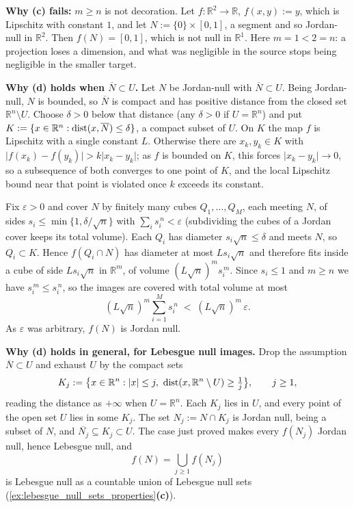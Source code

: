 \begin{exercisesolution}
\textbf{Why (c) fails:} $m \geq n$ is not decoration. Let $f : \mathbb{R}^2 \to \mathbb{R}$,
$f(x,y) := y$, which is Lipschitz with constant $1$, and let
$N := \{0\}\times[0,1]$, a segment and so Jordan-null in $\mathbb{R}^2$. Then $f(N) = [0,1]$,
which is not null in $\mathbb{R}^1$. Here $m = 1 < 2 = n$: a projection loses a dimension, and
what was negligible in the source stops being negligible in the smaller target.

\textbf{Why (d) holds when $\overline N \subset U$.} Let $N$ be Jordan-null with
$\overline N \subset U$. Being Jordan-null, $N$ is bounded, so $\overline N$ is compact and has
positive distance from the closed set $\mathbb{R}^n \setminus U$. Choose $\delta > 0$ below that
distance (any $\delta > 0$ if $U = \mathbb{R}^n$) and put
$K := \{x \in \mathbb{R}^n : \operatorname{dist}(x,\overline N) \leq \delta\}$, a compact subset of $U$. On $K$
the map $f$ is Lipschitz with a single constant $L$. Otherwise there are $x_k, y_k \in K$ with
$\lvert f(x_k) - f(y_k)\rvert > k\lvert x_k - y_k\rvert$; as $f$ is bounded on $K$, this forces
$\lvert x_k - y_k\rvert \to 0$, so a subsequence of both converges to one point of $K$, and the
local Lipschitz bound near that point is violated once $k$ exceeds its constant.

Fix $\varepsilon > 0$ and cover $N$ by finitely many cubes $Q_1,\dots,Q_M$, each meeting $N$, of
sides $s_i \leq \min\{1,\delta/\sqrt n\}$ with $\sum_i s_i^{\,n} < \varepsilon$ (subdividing the
cubes of a Jordan cover keeps its total volume). Each $Q_i$ has diameter
$s_i\sqrt n \leq \delta$ and meets $N$, so $Q_i \subset K$. Hence $f(Q_i \cap N)$ has diameter at
most $L s_i\sqrt n$ and therefore fits inside a cube of side $L s_i \sqrt n$ in $\mathbb{R}^m$, of
volume $(L\sqrt n)^m s_i^{\,m}$. Since $s_i \leq 1$ and $m \geq n$ we have
$s_i^{\,m} \leq s_i^{\,n}$, so the images are covered with total volume at most
\[(L\sqrt n)^m \sum_{i=1}^M s_i^{\,n} \;<\; (L\sqrt n)^m\,\varepsilon.\]
As $\varepsilon$ was arbitrary, $f(N)$ is Jordan null.

\textbf{Why (d) holds in general, for Lebesgue null images.} Drop the assumption
$\overline N \subset U$ and exhaust $U$ by the compact sets
\[K_j := \big\{x \in \mathbb{R}^n : \lvert x\rvert \leq j,\ \operatorname{dist}(x,\mathbb{R}^n\setminus U) \geq
  \tfrac1j\big\}, \qquad j \geq 1,\]
reading the distance as $+\infty$ when $U = \mathbb{R}^n$. Each $K_j$ lies in $U$, and every point
of the open set $U$ lies in some $K_j$. The set $N_j := N \cap K_j$ is Jordan null, being a subset
of $N$, and $\overline{N_j} \subseteq K_j \subset U$. The case just proved makes every $f(N_j)$
Jordan null, hence Lebesgue null, and
\[f(N) = \bigcup_{j\geq1} f(N_j)\]
is Lebesgue null as a countable union of Lebesgue null sets
(\cref{ex:lebesgue_null_sets_properties}\textbf{(c)}).


\end{exercisesolution}
